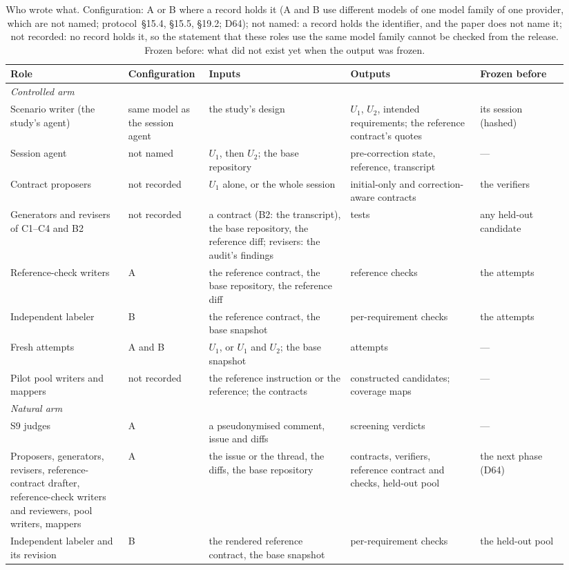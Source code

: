 \begin{table}[t]\centering\scriptsize\setlength{\tabcolsep}{3pt}
\caption{Who wrote what. Configuration: A or B where a record holds it (A and B use different models of one model family of one provider, which are not named; protocol~\S15.4, \S15.5, \S19.2; D64); not named: a record holds the identifier, and the paper does not name it; not recorded: no record holds it, so the statement that these roles use the same model family cannot be checked from the release. Frozen before: what did not exist yet when the output was frozen.}\label{tab:roles}
\begin{tabular}{@{}>{\raggedright\arraybackslash}p{0.2\linewidth}>{\raggedright\arraybackslash}p{0.13\linewidth}>{\raggedright\arraybackslash}p{0.24\linewidth}>{\raggedright\arraybackslash}p{0.22\linewidth}>{\raggedright\arraybackslash}p{0.15\linewidth}@{}}\toprule
Role & Configuration & Inputs & Outputs & Frozen before \\\midrule
\emph{Controlled arm} & & & & \\
Scenario writer (the study's agent) & same model as the session agent & the study's design & $U_1$, $U_2$, intended requirements; the reference contract's quotes & its session (hashed) \\
Session agent & not named & $U_1$, then $U_2$; the base repository & pre-correction state, reference, transcript & --- \\
Contract proposers & not recorded & $U_1$ alone, or the whole session & initial-only and correction-aware contracts & the verifiers \\
Generators and revisers of C1--C4 and B2 & not recorded & a contract (B2: the transcript), the base repository, the reference diff; revisers: the audit's findings & tests & any held-out candidate \\
Reference-check writers & A & the reference contract, the base repository, the reference diff & reference checks & the attempts \\
Independent labeler & B & the reference contract, the base snapshot & per-requirement checks & the attempts \\
Fresh attempts & A and B & $U_1$, or $U_1$ and $U_2$; the base snapshot & attempts & --- \\
Pilot pool writers and mappers & not recorded & the reference instruction or the reference; the contracts & constructed candidates; coverage maps & --- \\\addlinespace
\emph{Natural arm} & & & & \\
S9 judges & A & a pseudonymised comment, issue and diffs & screening verdicts & --- \\
Proposers, generators, revisers, reference-contract drafter, reference-check writers and reviewers, pool writers, mappers & A & the issue or the thread, the diffs, the base repository & contracts, verifiers, reference contract and checks, held-out pool & the next phase (D64) \\
Independent labeler and its revision & B & the rendered reference contract, the base snapshot & per-requirement checks & the held-out pool \\
\bottomrule\end{tabular}\end{table}

